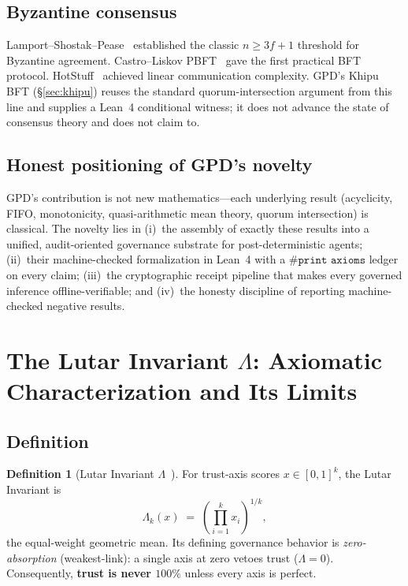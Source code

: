\documentclass[11pt,letterpaper]{article}
\theoremstyle{definition}
\newtheorem{definition}[theorem]{Definition}
\newcommand{\Lam}{\Lambda}
\begin{document}
\subsection{Byzantine consensus}

Lamport--Shostak--Pease~\cite{lamport1982} established the classic $n \ge 3f+1$
threshold for Byzantine agreement.  Castro--Liskov PBFT~\cite{castro1999} gave
the first practical BFT protocol.  HotStuff~\cite{yin2019hotstuff} achieved
linear communication complexity.  GPD's Khipu BFT (\S\ref{sec:khipu}) reuses
the standard quorum-intersection argument from this line and supplies a Lean~4
conditional witness; it does not advance the state of consensus theory and does
not claim to.

\subsection{Honest positioning of GPD's novelty}

GPD's contribution is not new mathematics---each underlying result (acyclicity,
FIFO, monotonicity, quasi-arithmetic mean theory, quorum intersection) is
classical.  The novelty lies in (i)~the assembly of exactly these results into a
unified, audit-oriented governance substrate for post-deterministic agents;
(ii)~their machine-checked formalization in Lean~4 with a $\texttt{\#print axioms}$
ledger on every claim; (iii)~the cryptographic receipt pipeline that makes every
governed inference offline-verifiable; and (iv)~the honesty discipline of
reporting machine-checked negative results.

\section{The Lutar Invariant \texorpdfstring{$\Lam$}{Lambda}: Axiomatic
         Characterization and Its Limits}
\label{sec:lambda}

\subsection{Definition}

\begin{definition}[Lutar Invariant $\Lam$~\cite{szl_v3,szl_concept}]
\label{def:lambda}
For trust-axis scores $x \in [0,1]^k$, the Lutar Invariant is
\[
  \Lam_k(x) \;=\; \left(\prod_{i=1}^{k} x_i\right)^{1/k},
\]
the equal-weight geometric mean.  Its defining governance behavior is
\emph{zero-absorption} (weakest-link): a single axis at zero vetoes trust
($\Lam = 0$).  Consequently, \textbf{trust is never $100\%$} unless
every axis is perfect.
\end{definition}
\end{document}

